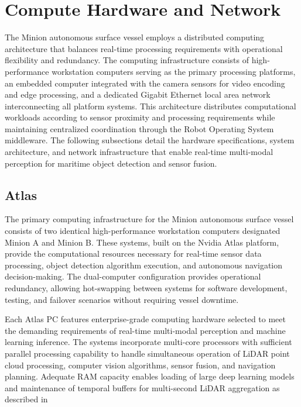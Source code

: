\documentclass{erauthesis}
\begin{document}
\section{Compute Hardware and Network} \label{sec:Atlas_LAN}

The Minion autonomous surface vessel employs a distributed computing architecture that balances real-time processing requirements with operational flexibility and redundancy. The computing infrastructure consists of high-performance workstation computers serving as the primary processing platforms, an embedded computer integrated with the camera sensors for video encoding and edge processing, and a dedicated Gigabit Ethernet local area network interconnecting all platform systems. This architecture distributes computational workloads according to sensor proximity and processing requirements while maintaining centralized coordination through the Robot Operating System middleware. The following subsections detail the hardware specifications, system architecture, and network infrastructure that enable real-time multi-modal perception for maritime object detection and sensor fusion.

\subsection{Atlas} \label{atlas}

The primary computing infrastructure for the Minion autonomous surface vessel consists of two identical high-performance workstation computers designated Minion A and Minion B. These systems, built on the Nvidia Atlas platform, provide the computational resources necessary for real-time sensor data processing, object detection algorithm execution, and autonomous navigation decision-making. The dual-computer configuration provides operational redundancy, allowing hot-swapping between systems for software development, testing, and failover scenarios without requiring vessel downtime.

Each Atlas PC features enterprise-grade computing hardware selected to meet the demanding requirements of real-time multi-modal perception and machine learning inference. The systems incorporate multi-core processors with sufficient parallel processing capability to handle simultaneous operation of LiDAR point cloud processing, computer vision algorithms, sensor fusion, and navigation planning. Adequate RAM capacity enables loading of large deep learning models and maintenance of temporal buffers for multi-second LiDAR aggregation as described in %
\end{document}

